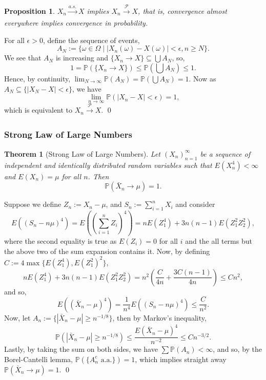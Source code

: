 \documentclass[
]{article}
\newtheorem{theorem}{Theorem}
\newtheorem{prop}{Proposition}[theorem]
\theoremstyle{definition}
\begin{document}
\begin{prop}
  \(X_n \xrightarrow[]{a.s.} X\) implies 
  \(X_n \xrightarrow[]{\mathcal{P}} X\), that is, convergence 
  almost everywhere implies convergence in probability.
\end{prop}
\proof

For all \(\epsilon > 0\), define the sequence of events,
\[A_N := \{\omega \in \Omega \mid \left| X_n(\omega) - X(\omega) \right| < \epsilon, n \ge N\}.\]
We see that \(A_N\) is increasing and
\(\{X_n \to X\} \subseteq \bigcup A_N\), so,
\[1 = \mathbb{P}(\{X_n \to X\}) \le \mathbb{P}\left(\bigcup A_N\right) \le 1.\]
Hence, by continuity,
\(\lim_{N \to \infty} \mathbb{P}(A_N) =  \mathbb{P}(\bigcup A_N) = 1\).
Now as \(A_N \subseteq \{\left| X_N - X \right| < \epsilon\}\), we have
\[\lim_{n \to \infty} \mathbb{P}(\left| X_n - X \right| < \epsilon) = 1,\]
which is equivalent to \(X_n \xrightarrow[]{\mathcal{P}} X\). \qed

\hypertarget{strong-law-of-large-numbers}{%
\subsubsection{Strong Law of Large
Numbers}\label{strong-law-of-large-numbers}}

\begin{theorem}[Strong Law of Large Numbers]
  Let \((X_n)_{n = 1}^\infty\) be a sequence of independent and identically 
  distributed random variables such that \(E(X_n^4) < \infty\) and \(E(X_n) = \mu\) 
  for all \(n\). Then
  \[\mathbb{P}(\bar{X}_n \to \mu) = 1.\]
\end{theorem}
\proof

Suppose we define \(Z_n := X_n - \mu\), and
\(S_n := \sum_{i = 1}^n X_i\) and consider
\[E((S_n - n\mu)^4) = E((\sum_{i = 1}^n Z_i)^4) = n E(Z_1^4) + 3n(n - 1)E(Z_1^2Z_2^2),\]
where the second equality is true as \(E(Z_i) = 0\) for all \(i\) and
the all terms but the above two of the sum expansion contains it. Now,
by defining \(C := 4 \max \{E(Z_1^4), E(Z_1^2)^2\}\),
\[n E(Z_1^4) + 3n(n - 1)E(Z_1^2Z_2^2) = 
  n^2 \left(\frac{C}{4n} + \frac{3C(n - 1)}{4n} \right) \le Cn^2,\] and
so,
\[E((\bar{X}_n - \mu)^4) = \frac{1}{n^4}E((S_n - n\mu)^4) \le \frac{C}{n^2}.\]
Now, let \(A_n := \{\left| \bar{X}_n - \mu \right| \ge n^{-1 / 8}\}\),
then by Markov's inequality,
\[\mathbb{P}(\left| \bar{X}_n - \mu \right| \ge n^{- 1 / 8}) \le 
    \frac{E(\bar{X}_n - \mu)^4}{n^{-2}} \le Cn^{- 3 / 2}.\] Lastly, by
taking the sum on both sides, we have \(\sum \mathbb{P}(A_n) < \infty\),
and so, by the Borel-Cantelli lemma,
\(\mathbb{P}(\{A_n^c \text{ a.a.}\}) = 1\), which implies straight away
\(\mathbb{P}(\bar{X}_n \to \mu) = 1\). \qed
\end{document}
